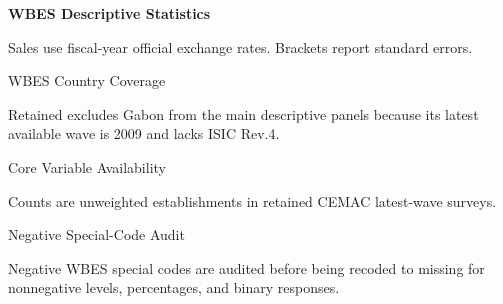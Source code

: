 \documentclass[aspectratio=169]{beamer}
\begin{document}
\begin{frame}[plain]
    \centering
    {\small\bfseries WBES Descriptive Statistics}

    \vspace{0.03cm}
    \centering
    \tiny

    \vspace{0.03cm}
    {\tiny Sales use fiscal-year official exchange rates. Brackets report standard errors.}
\end{frame}

\begin{frame}{WBES Country Coverage}
    \footnotesize
    \centering

    \vspace{0.25cm}
    {\scriptsize Retained excludes Gabon from the main descriptive panels because its latest available wave is 2009 and lacks ISIC Rev.4.}
\end{frame}

\begin{frame}{Core Variable Availability}
    \vspace{-0.2cm}
    \centering
    \tiny

    \vspace{0.2cm}
    {\scriptsize Counts are unweighted establishments in retained CEMAC latest-wave surveys.}
\end{frame}

\begin{frame}{Negative Special-Code Audit}
    \vspace{-0.2cm}
    \centering
    \tiny

    \vspace{0.2cm}
    {\scriptsize Negative WBES special codes are audited before being recoded to missing for nonnegative levels, percentages, and binary responses.}
\end{frame}
\end{document}
